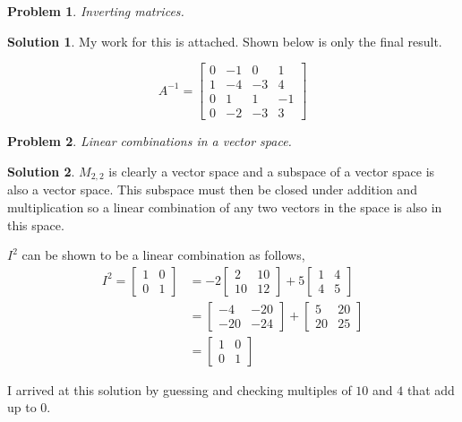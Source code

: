 \documentclass{article}
\newtheorem{problem}{Problem}
\theoremstyle{definition}
\newtheorem*{solution}{Solution}
\begin{document}
\begin{problem} 

Inverting matrices.

\end{problem}

\begin{solution}

My work for this is attached.
Shown below is only the final result.

\[
A^{-1}=
\begin{bmatrix}
0&-1&0&1\\
1&-4&-3&4\\
0&1&1&-1\\
0&-2&-3&3
\end{bmatrix}\]

\end{solution}

\begin{problem}

Linear combinations in a vector space.

\end{problem}

\begin{solution}

$M_{2,2}$ is clearly a vector space and a subspace of a vector space is also a vector space.
This subspace must then be closed under addition and multiplication so a linear combination of any two vectors in the space is also in this space.

$I^2$ can be shown to be a linear combination as follows,
\begin{align*}
I^2=\begin{bmatrix}
1&0\\0&1
\end{bmatrix}&=-2
\begin{bmatrix}
2&10\\
10&12
\end{bmatrix}+5
\begin{bmatrix}
1&4\\
4&5
\end{bmatrix}\\
&=
\begin{bmatrix}
-4&-20\\
-20&-24
\end{bmatrix}+
\begin{bmatrix}
5&20\\
20&25
\end{bmatrix}\\
&=
\begin{bmatrix}
1&0\\0&1
\end{bmatrix}
\end{align*}

I arrived at this solution by guessing and checking multiples of $10$ and $4$ that add up to $0$.

\end{solution}
\end{document}
